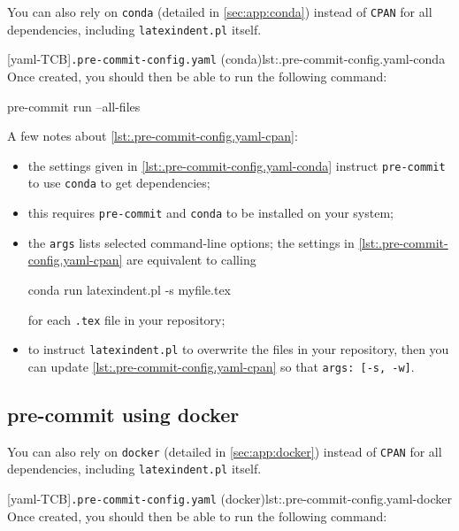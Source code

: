   You can also rely on \texttt{conda} (detailed in \cref{sec:app:conda}) instead of
  \texttt{CPAN} for all dependencies, including \texttt{latexindent.pl} itself.
    

  [yaml-TCB]{\texttt{.pre-commit-config.yaml} (conda)}{lst:.pre-commit-config.yaml-conda}
  Once created, you should then be able to run the following command:

  \begin{commandshell}
pre-commit run --all-files
\end{commandshell}

  A few notes about \cref{lst:.pre-commit-config.yaml-cpan}:
  \begin{itemize}
   \item the settings given in \cref{lst:.pre-commit-config.yaml-conda} instruct
         \texttt{pre-commit} to use \texttt{conda} to get dependencies;
   \item this requires \texttt{pre-commit} and \texttt{conda} to be installed on your
         system;
   \item the \texttt{args} lists selected command-line options; the settings in
         \cref{lst:.pre-commit-config.yaml-cpan} are equivalent to calling

         \begin{commandshell}
conda run latexindent.pl -s myfile.tex
\end{commandshell}

         for each \texttt{.tex} file in your repository;
   \item to instruct \texttt{latexindent.pl} to overwrite the files in your repository,
         then you can update \cref{lst:.pre-commit-config.yaml-cpan} so that
         \texttt{args: [-s, -w]}.
  \end{itemize}

 \subsection{pre-commit using docker}\label{sec:pre-commit-docker}

  You can also rely on \texttt{docker} (detailed in \cref{sec:app:docker}) instead of
  \texttt{CPAN} for all dependencies, including \texttt{latexindent.pl} itself.
    

  [yaml-TCB]{\texttt{.pre-commit-config.yaml} (docker)}{lst:.pre-commit-config.yaml-docker}
  Once created, you should then be able to run the following command:

